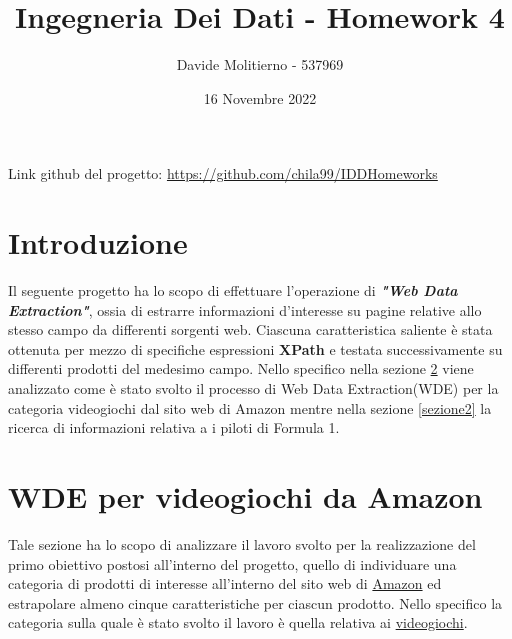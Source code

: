 \documentclass[12pt, letterpaper]{article}
\title{Ingegneria Dei Dati - Homework 4}
\author{Davide Molitierno - 537969}
\date{16 Novembre 2022}
\begin{document}
\maketitle
Link github del progetto: \url{https://github.com/chila99/IDDHomeworks}

\section{Introduzione}
Il seguente progetto ha lo scopo di effettuare l'operazione di \emph{\textbf{"Web Data Extraction"}}, ossia di estrarre informazioni d'interesse su pagine relative allo stesso campo da differenti sorgenti web. Ciascuna caratteristica saliente è stata ottenuta per mezzo di specifiche espressioni \textbf{XPath} e testata successivamente su differenti prodotti del medesimo campo.
Nello specifico nella sezione \ref{sezione1} viene analizzato come è stato svolto il processo di Web Data Extraction(WDE) per la categoria videogiochi dal sito web di Amazon mentre nella sezione \ref{sezione2} la ricerca di informazioni relativa a i piloti di Formula 1.
\section{WDE per videogiochi da Amazon} \label{sezione1}
Tale sezione ha lo scopo di analizzare il lavoro svolto per la realizzazione del primo obiettivo postosi all'interno del progetto, quello di individuare una categoria di prodotti di interesse all'interno del sito web di \href{https://www.amazon.it}{Amazon} ed estrapolare almeno cinque caratteristiche per ciascun prodotto. Nello specifico la categoria sulla quale è stato svolto il lavoro è quella relativa ai \href{https://www.amazon.it/s/ref=nb_sb_noss?__mk_it_IT=ÅMÅŽÕÑ&url=search-alias%3Dvideogames&field-keywords=&crid=2GIVFOZXKUAZD&sprefix=%2Cvideogames%2C110}{videogiochi}.
\end{document}
